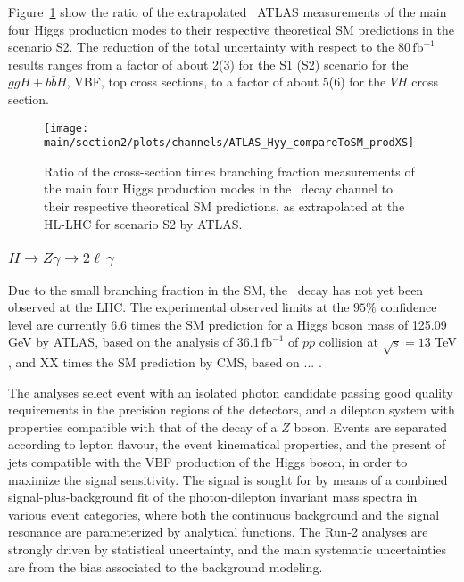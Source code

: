 Figure~\ref{fig:Hyy_ATLAS_HLLHC_S2} show the ratio of the extrapolated \Hyy\ ATLAS measurements of the main four Higgs production modes to their respective theoretical SM predictions in the scenario S2. The reduction of the total uncertainty with respect to the 80\,$\mathrm{fb}^{-1}$ results ranges from a factor of about 2(3) for the S1 (S2) scenario for the $ggH+b\bar{b}H$, VBF, top cross sections, to a factor of about 5(6) for the $VH$ cross section.

\begin{figure}
  \centering
  \texttt{[image: \\main/section2/plots/channels/ATLAS\_Hyy\_compareToSM\_prodXS]}
  \caption{Ratio of the cross-section times branching fraction measurements of the main four Higgs production modes in the \Hyy\ decay channel to their respective theoretical SM predictions, as extrapolated at the HL-LHC for scenario S2 by ATLAS.}
  \label{fig:Hyy_ATLAS_HLLHC_S2}
\end{figure}

\subsubsection{$H \to Z\gamma \to 2\ell\,\gamma$}

Due to the small branching fraction in the SM, the \HZy\ decay has not yet been observed at the LHC. The experimental observed limits at the $95\%$ confidence level are currently 6.6 times the SM prediction for a Higgs boson mass of 125.09 GeV by ATLAS, based on the analysis of 36.1\,$\mathrm{fb}^{-1}$ of $pp$ collision at $\sqrt{s} = 13$ TeV \cite{HIGG-2016-14}, and XX times the SM prediction by CMS, based on ... \cite{}.

The analyses select event with an isolated photon candidate passing good quality requirements in the precision regions of the detectors, and a dilepton system with properties compatible with that of the decay of a $Z$ boson. Events are separated according to lepton flavour, the event kinematical properties, and the present of jets compatible with the VBF production of the Higgs boson, in order to maximize the signal sensitivity. The signal is sought for by means of a combined signal-plus-background fit of the photon-dilepton invariant mass spectra in various event categories, where both the continuous background and the signal resonance are parameterized by analytical functions. The Run-2 analyses are strongly driven by statistical uncertainty, and the main systematic uncertainties are from the bias associated to the background modeling.

